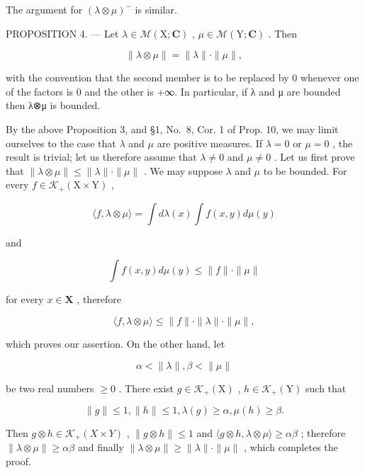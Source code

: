 The argument for \((\lambda \otimes \mu)^{-}\) is similar.

PROPOSITION 4. --- Let \(\lambda \in \mathcal{M}(\mathrm{X};\mathbf{C})\) , \(\mu \in \mathcal{M}(\mathrm{Y};\mathbf{C})\) . Then

\[
\| \lambda \otimes \mu \| = \| \lambda \| \cdot \| \mu \|,\tag{10}
\]

with the convention that the second member is to be replaced by 0 whenever one of the factors is 0 and the other is +∞. In particular, if λ and μ are bounded then λ⊗μ is bounded.

By the above Proposition 3, and §1, No.~8, Cor. 1 of Prop. 10, we may limit ourselves to the case that \(\lambda\) and \(\mu\) are positive measures. If \(\lambda = 0\) or \(\mu = 0\) , the result is trivial; let us therefore assume that \(\lambda \neq 0\) and \(\mu \neq 0\) . Let us first prove that \(\| \lambda \otimes \mu \| \leqslant \| \lambda \| \cdot \| \mu \|\) . We may suppose \(\lambda\) and \(\mu\) to be bounded. For every \(f \in \mathcal{K}_+(\mathrm{X} \times \mathrm{Y})\) ,

\[
\langle f, \lambda \otimes \mu \rangle = \int d \lambda (x) \int f (x, y) d \mu (y)
\]

and

\[
\int f (x, y) d \mu (y) \leqslant \| f \| \cdot \| \mu \|
\]

for every \(x\in \mathbf{X}\) , therefore

\[
\langle f, \lambda \otimes \mu \rangle \leqslant \| f \| \cdot \| \lambda \| \cdot \| \mu \|,
\]

which proves our assertion. On the other hand, let

\[
\alpha <   \| \lambda \|, \beta <   \| \mu \|
\]

be two real numbers \(\geqslant 0\) . There exist \(g\in \mathcal{K}_{+}(\mathrm{X})\) , \(h\in \mathcal{K}_{+}(\mathrm{Y})\) such that

\[
\| g \| \leqslant 1, \| h \| \leqslant 1, \lambda (g) \geqslant \alpha , \mu (h) \geqslant \beta .
\]

Then \(g \otimes h \in \mathcal{K}_{+}(X \times Y)\) , \(\| g \otimes h \| \leqslant 1\) and \(\langle g \otimes h, \lambda \otimes \mu \rangle \geqslant \alpha \beta\) ; therefore \(\| \lambda \otimes \mu \| \geqslant \alpha \beta\) and finally \(\| \lambda \otimes \mu \| \geqslant \| \lambda \| \cdot \| \mu \|\) , which completes the proof.

